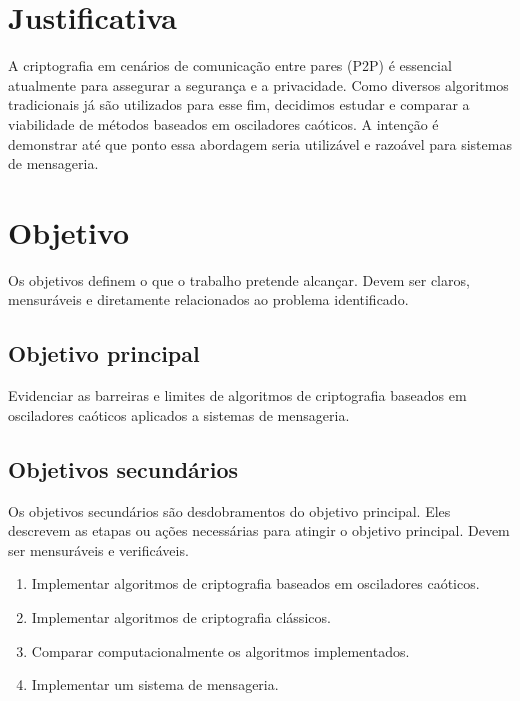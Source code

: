 \documentclass[
    12pt,                %
    openright,           %
    oneside,             %
    a4paper,             %
    english,             %
    brazil               %
]{abntex2}
\begin{document}
\section{Justificativa}
\label{sec:justificativa}

A criptografia em cenários de comunicação entre pares (P2P) é essencial atualmente para assegurar a segurança e a privacidade. 
Como diversos algoritmos tradicionais já são utilizados para esse fim, decidimos estudar e comparar a viabilidade de métodos baseados 
em osciladores caóticos. A intenção é demonstrar até que ponto essa abordagem seria utilizável e razoável para sistemas de mensageria.

\section{Objetivo}
\label{sec:objetivo}

Os objetivos definem o que o trabalho pretende alcançar. Devem ser claros, mensuráveis e diretamente relacionados ao problema identificado.

\subsection{Objetivo principal}

Evidenciar as barreiras e limites de algoritmos de criptografia baseados em osciladores caóticos aplicados a sistemas de mensageria.

\subsection{Objetivos secundários}

Os objetivos secundários são desdobramentos do objetivo principal. Eles descrevem as etapas ou ações necessárias para atingir o objetivo principal. Devem ser mensuráveis e verificáveis.

\begin{enumerate}
    \item Implementar algoritmos de criptografia baseados em osciladores caóticos.
    \item Implementar algoritmos de criptografia clássicos.
    \item Comparar computacionalmente os algoritmos implementados.
    \item Implementar um sistema de mensageria.
\end{enumerate}
\end{document}
